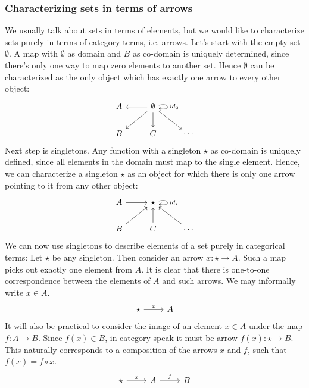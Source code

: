 \documentclass[12pt, a4paper]{article}
\numberwithin{equation}{section}
\begin{document}
\subsubsection{Characterizing sets in terms of arrows}
We usually talk about sets in terms of elements, but we would like to characterize sets purely in terms of category terms, i.e. arrows. Let's start with the empty set $\emptyset$. A map with $\emptyset$ as domain and $B$ as co-domain is uniquely determined, since there's only one way to map zero elements to another set. Hence $\emptyset$ can be characterized as the only object which has exactly one arrow to every other object:
\begin{equation*}
\begin{tikzcd}
A &
\emptyset\arrow[l]\arrow[ld]\arrow[d]\arrow[rd]\arrow[loop right, "id_\emptyset"]
\\
B & C & \cdots
\end{tikzcd}
\end{equation*}
Next step is singletons. Any function with a singleton $\star$ as co-domain is uniquely defined, since all elements in the domain must map to the single element. Hence, we can characterize a singleton $\star$ as an object for which there is only one arrow pointing to it from any other object:
\begin{equation*}
\begin{tikzcd}
A\arrow[r] &
\star\arrow[loop right, "id_\star"]
\\
B\arrow[ur] & C\arrow[u] & \cdots\arrow[ul]
\end{tikzcd}
\end{equation*}
We can now use singletons to describe elements of a set purely in categorical terms: Let $\star$ be any singleton. Then consider an arrow $x:\star\rightarrow A$. Such a map picks out exactly one element from $A$. It is clear that there is one-to-one correspondence between the elements of $A$ and such arrows. We may informally write $x\in A$.
\begin{equation*}
\begin{tikzcd}
\star\arrow[r, "x"] & A
\end{tikzcd}
\end{equation*}
It will also be practical to consider the image of an element $x\in A$ under the map $f:A\rightarrow B$. Since $f(x)\in B$, in category-speak it must be arrow $f(x):\star\rightarrow B$. This naturally corresponds to a composition of the arrows $x$ and $f$, such that $f(x)=f\circ x$.
\begin{equation*}
\begin{tikzcd}
\star\arrow[r, "x"] &
A\arrow[r, "f"] &
B
\end{tikzcd}
\end{equation*}
\end{document}
